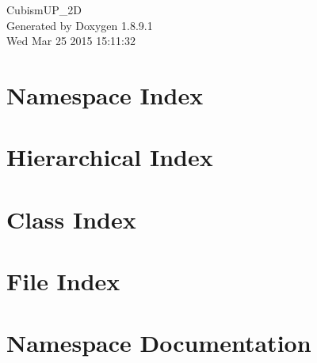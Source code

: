 \documentclass[twoside]{book}
\newcommand{\+}{\discretionary{\mbox{\scriptsize$\hookleftarrow$}}{}{}}
\newcommand{\clearemptydoublepage}{%
  \newpage{\pagestyle{empty}\cleardoublepage}%
}
\begin{document}
\hypersetup{pageanchor=false,
             bookmarks=true,
             bookmarksnumbered=true,
             pdfencoding=unicode
            }
\begin{titlepage}
\vspace*{7cm}
\begin{center}%
{\Large Cubism\+U\+P\+\_\+2\+D }\\
\vspace*{1cm}
{\large Generated by Doxygen 1.8.9.1}\\
\vspace*{0.5cm}
{\small Wed Mar 25 2015 15:11:32}\\
\end{center}
\end{titlepage}
\clearemptydoublepage
\tableofcontents
\clearemptydoublepage
{}
\hypersetup{pageanchor=true}

\chapter{Namespace Index}

\chapter{Hierarchical Index}

\chapter{Class Index}

\chapter{File Index}

\chapter{Namespace Documentation}

\end{document}
